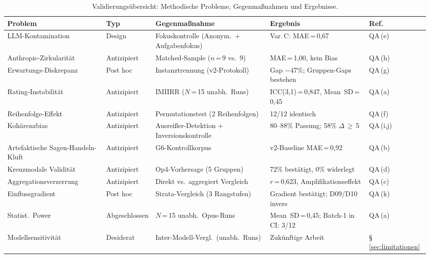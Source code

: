\documentclass[12pt,a4paper]{article}
\begin{document}
\begin{table}[htbp]
  \centering
  \caption{Validierungs\"ubersicht: Methodische Probleme, Gegenma\ss{}nahmen und Ergebnisse.}
  \label{tab:validation_overview}
  \scriptsize
  \begin{tabular}{@{} p{2.4cm} p{1.4cm} p{4.2cm} p{4.5cm} p{1.0cm} @{}}
    \toprule
    \textbf{Problem} & \textbf{Typ} & \textbf{Gegenma\ss{}nahme} & \textbf{Ergebnis} & \textbf{Ref.} \\
    \midrule
    LLM-Kontamination & Design & Fokuskontrolle (Anonym.\ + Aufgabenfokus) & Var.\,C: MAE\,=\,0,67 & QA\,(e) \\[3pt]
    Anthropic-Zirkularit\"at & Antizipiert & Matched-Sample ($n$\,=\,9 vs.\ 9) & MAE\,=\,1,00, kein Bias & QA\,(h) \\[3pt]
    Erwartungs-Diskrepanz & Post hoc & Instanztrennung (v2-Protokoll) & Gap $-47\%$; Gruppen-Gaps bestehen & QA\,(g) \\[3pt]
    Rating-Instabilit\"at & Antizipiert & IMIIRR ($N$\,=\,15 unabh.\ Runs) & ICC(3,1)\,=\,0,847, Mean~SD\,=\,0,45 & QA\,(a) \\[3pt]
    Reihenfolge-Effekt & Antizipiert & Permutationstest (2 Reihenfolgen) & 12/12 identisch & QA\,(f) \\[3pt]
    Koh\"arenzbias & Antizipiert & Ausrei\ss{}er-Detektion + Inversionskontrolle & 80--88\% Passung; 58\% $\Delta$\,$\geq$\,5 & QA\,(i,j) \\[3pt]
    Artefaktische Sagen-Handeln-Kluft & Antizipiert & G6-Kontrollkorpus & v2-Baseline MAE\,=\,0,92 & QA\,(b) \\[3pt]
    Kreuzmodale Validit\"at & Antizipiert & Op4-Vorhersage (5 Gruppen) & 72\% best\"atigt, 0\% widerlegt & QA\,(d) \\[3pt]
    Aggregationsverzerrung & Antizipiert & Direkt vs.\ aggregiert Vergleich & $r$\,=\,0,623, Amplifikationseffekt & QA\,(c) \\[3pt]
    Einflussgradient & Post hoc & Strata-Vergleich (3 Rangstufen) & Gradient best\"atigt; D09/D10 invers & QA\,(k) \\[3pt]
    Statist.\ Power & Abgeschlossen & $N$\,=\,15 unabh.\ Opus-Runs & Mean~SD\,=\,0,45; Batch-1 in CI: 3/12 & QA\,(a) \\[3pt]
    Modellsensitivit\"at & Desiderat & Inter-Modell-Vergl.\ (unabh.\ Runs) & Zuk\"unftige Arbeit & \S\,\ref{sec:limitationen} \\
    \bottomrule
  \end{tabular}
\end{table}
\end{document}
